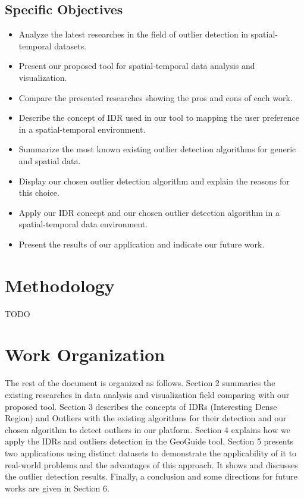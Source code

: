 \subsection{Specific Objectives}

\begin{itemize}
	\item
	      Analyze the latest researches in the field of outlier detection in spatial-temporal
	      datasets.
	\item
	      Present our proposed tool for spatial-temporal data analysis and visualization.
	\item
	      Compare the presented researches showing the pros and cons of each work.
	\item
	      Describe the concept of IDR used in our tool to mapping the user preference in a
	      spatial-temporal environment.
	\item
	      Summarize the most known existing outlier detection algorithms for generic and spatial
	      data.
	\item
	      Display our chosen outlier detection algorithm and explain the reasons for this choice.
	\item
	      Apply our IDR concept and our chosen outlier detection algorithm in a spatial-temporal
	      data environment.
	\item
	      Present the results of our application and indicate our future work.

\end{itemize}

\section{Methodology}

TODO

\section{Work Organization}

The rest of the document is organized as follows. Section 2 summaries the existing researches
in data analysis and visualization field comparing with our proposed tool. Section 3 describes
the concepts of IDRs (Interesting Dense Region) and Outliers with the existing algorithms for
their detection and our chosen algorithm to detect outliers in our platform. Section 4 explains
how we apply the IDRs and outliers detection in the GeoGuide tool. Section 5 presents two
applications using distinct datasets to demonstrate the applicability of it to real-world
problems and the advantages of this approach. It shows and discusses the outlier detection
results. Finally, a conclusion and some directions for future works are given in Section 6.
